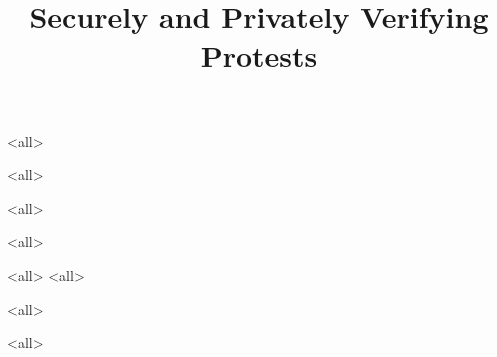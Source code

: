 \title{%
  Securely and Privately Verifying Protests
}

\maketitle

\mode*

\begin{abstract}
  
\end{abstract}

\clearpage
\tableofcontents
\clearpage

\mode<all>


\mode<all>

\mode<all>

\mode<all>


\mode<all>
%
\mode<all>
%

\mode<all>

\mode<all>




\begin{frame}[allowframebreaks]
  \printbibliography{}
\end{frame}
